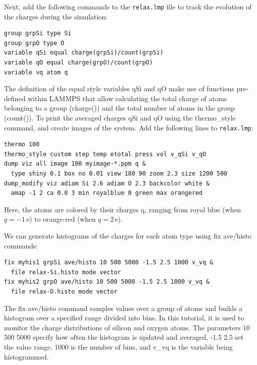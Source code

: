 \documentclass[9pt,tutorial]{livecoms}
\newcommand{\lmpcmd}[1]{\colorbox{listing}{\textcolor{command}{\small{#1}}}} %
\newcommand{\flecmd}[1]{\textcolor{command}{\texttt{#1}}} %
\begin{document}
Next, add the following commands to the \flecmd{relax.lmp} file to track the
evolution of the charges during the simulation:
\begin{lstlisting}
group grpSi type Si
group grpO type O
variable qSi equal charge(grpSi)/count(grpSi)
variable qO equal charge(grpO)/count(grpO)
variable vq atom q
\end{lstlisting}
{\color{blue} The definition of the equal style variables qSi and qO
make use of functions pre-defined within LAMMPS that allow calculating 
the total charge of atoms belonging to a group (charge()) and the total
number of atoms in the group (count()).  }
To print the averaged charges \lmpcmd{qSi} and \lmpcmd{qO} using the
\lmpcmd{thermo\_style} command, and create images of the system.  Add the
following lines to \flecmd{relax.lmp}:
\begin{lstlisting}
thermo 100
thermo_style custom step temp etotal press vol v_qSi v_qO
dump viz all image 100 myimage-*.ppm q &
  type shiny 0.1 box no 0.01 view 180 90 zoom 2.3 size 1200 500
dump_modify viz adiam Si 2.6 adiam O 2.3 backcolor white &
  amap -1 2 ca 0.0 3 min royalblue 0 green max orangered
\end{lstlisting}
Here, the atoms are colored by their charges \lmpcmd{q}, ranging from royal blue
(when $q=-1\,\text{e}$) to orange-red (when $q=2\,\text{e}$).

We can generate histograms of the charges for each atom type using
\lmpcmd{fix ave/histo} commands:
\begin{lstlisting}
fix myhis1 grpSi ave/histo 10 500 5000 -1.5 2.5 1000 v_vq &
  file relax-Si.histo mode vector
fix myhis2 grpO ave/histo 10 500 5000 -1.5 2.5 1000 v_vq &
  file relax-O.histo mode vector
\end{lstlisting}
{\color{blue}The \lmpcmd{fix ave/histo} command samples values
over a group of atoms and builds a histogram over a specified range divided into
bins.  In this tutorial, it is used to monitor the charge distributions
of silicon and oxygen atoms.  The parameters \lmpcmd{10 500 5000} specify how often
the histogram is updated and averaged, \lmpcmd{-1.5 2.5} set the value range,
\lmpcmd{1000} is the number of bins, and \lmpcmd{v\_vq} is the variable being histogrammed.}
\end{document}
